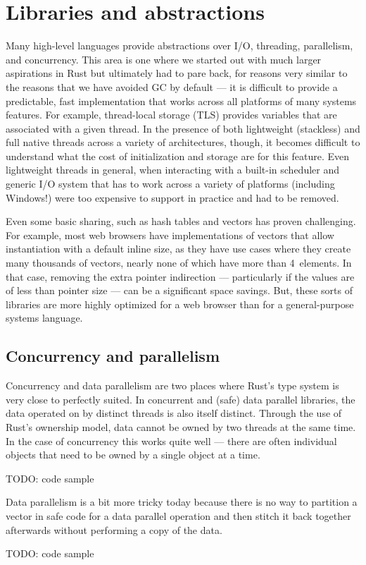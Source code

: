 
\section{Libraries and abstractions}
\label{sec:libraries}

Many high-level languages provide abstractions over I/O, threading, parallelism, and concurrency.
This area is one where we started out with much larger aspirations in Rust but ultimately had to pare back,
for reasons very similar to the reasons that we have avoided GC by default --- it is difficult to provide a
predictable, fast implementation that works across all platforms of many systems features.
For example, thread-local storage (TLS) provides variables that are associated with a given thread.
In the presence of both lightweight (stackless) and full native threads across a variety of architectures, though,
it becomes difficult to understand what the cost of initialization and storage are for this feature.
Even lightweight threads in general, when interacting with a built-in scheduler and generic I/O system that
has to work across a variety of platforms (including Windows!) were too expensive to support in practice and
had to be removed.

Even some basic sharing, such as hash tables and vectors has proven challenging.
For example, most web browsers have implementations of vectors that allow instantiation with a default inline size,
as they have use cases where they create many thousands of vectors, nearly none of which have more than 4~elements.
In that case, removing the extra pointer indirection --- particularly if the values are of less than pointer size ---
can be a significant space savings.
But, these sorts of libraries are more highly optimized for a web browser than for a general-purpose systems language.

\subsection{Concurrency and parallelism}

Concurrency and data parallelism are two places where Rust's type system is very close to perfectly suited.
In concurrent and (safe) data parallel libraries, the data operated on by distinct threads is also itself distinct.
Through the use of Rust's ownership model, data cannot be owned by two threads at the same time.
In the case of concurrency this works quite well --- there are often individual objects that need to be owned by
a single object at a time.

TODO: code sample

Data parallelism is a bit more tricky today because there is no way to \eg{} partition a vector in safe code
for a data parallel operation and then stitch it back together afterwards without performing a copy of the data.

TODO: code sample


